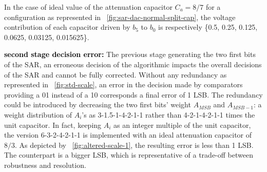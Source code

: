 In the case of ideal value of the attenuation capacitor $C_a = 8/7$ for a configuration as represented in \figurename~\ref{fig:sar-dac-normal-split-cap}, the voltage contribution of each capacitor driven by $b_5$ to $b_0$ is respectively \{0.5, 0.25, 0.125, 0.0625, 0.03125, 0.015625\}.

\textbf{\textcolor{black}{second stage decision error:}}
The previous stage generating the two first bits of the SAR, an erroneous decision of the algorithmic impacts the overall decisions of the SAR and cannot be fully corrected. Without any redundancy as represented in \figurename~\ref{fig:std-scale}, an error in the decision made by comparators providing a 01 instead of a 10 corresponds a final error of 1 LSB\@. The redundancy could be introduced by decreasing the two first bits’ weight \(A_{MSB}\) and \(A_{MSB-1}\): a weight distribution of \(A_i\)'s as 3-1.5-1-4-2-1-1 rather than 4-2-1-4-2-1-1 times the unit capacitor. In fact, keeping \(A_i\) as an integer multiple of the unit capacitor, the version 6-3-2-4-2-1-1 is implemented with an ideal attenuation capacitor of \(8/3\). As depicted by \figurename~\ref{fig:altered-scale-1}, the resulting error is less than 1 LSB\@. The counterpart is a bigger LSB, which is representative of a trade-off between robustness and resolution.

